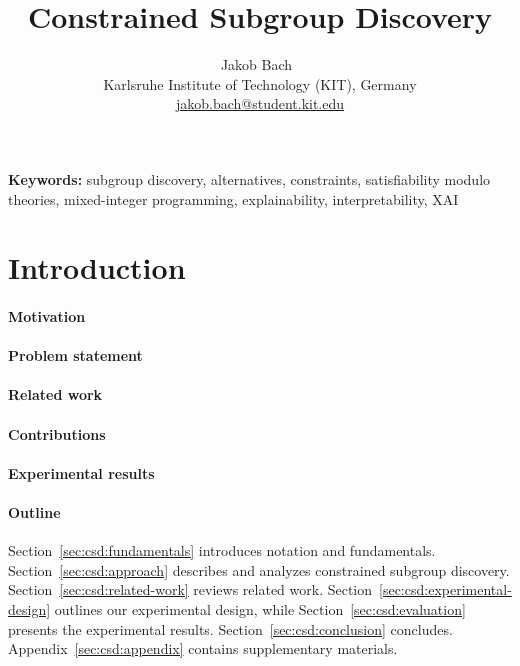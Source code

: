 \documentclass{article}
\title{
	Constrained Subgroup Discovery
}
\author{
	Jakob Bach~\orcidlink{0000-0003-0301-2798}\\
	\small Karlsruhe Institute of Technology (KIT), Germany\\
	\small \href{mailto:jakob.bach@student.kit.edu}{jakob.bach@student.kit.edu}
}
\date{} %
\theoremstyle{definition}
\begin{document}
\maketitle

\begin{abstract}
\end{abstract}
%
\textbf{Keywords:} subgroup discovery, alternatives, constraints, satisfiability modulo theories, mixed-integer programming, explainability, interpretability, XAI

\section{Introduction}
\label{sec:csd:introduction}

\paragraph{Motivation}

\cite{carvalho2019machine} \cite{molnar2020interpretable}

\paragraph{Problem statement}

\paragraph{Related work}

\paragraph{Contributions}

\paragraph{Experimental results}

\paragraph{Outline}

Section~\ref{sec:csd:fundamentals} introduces notation and fundamentals.
Section~\ref{sec:csd:approach} describes and analyzes constrained subgroup discovery.
Section~\ref{sec:csd:related-work} reviews related work.
Section~\ref{sec:csd:experimental-design} outlines our experimental design, while Section~\ref{sec:csd:evaluation} presents the experimental results.
Section~\ref{sec:csd:conclusion} concludes.
Appendix~\ref{sec:csd:appendix} contains supplementary materials.
\end{document}
